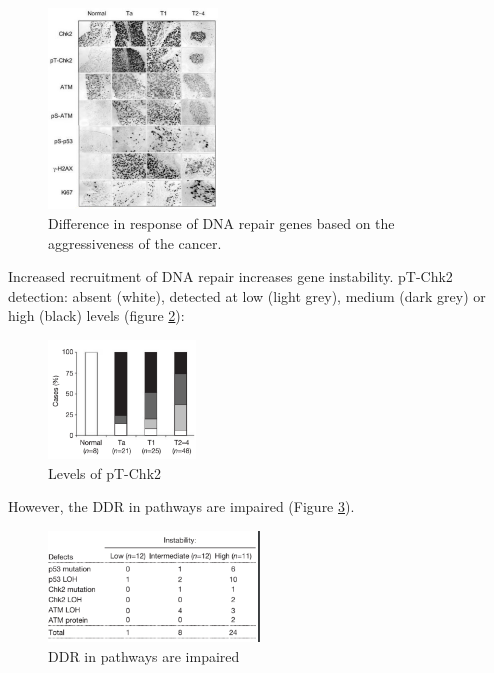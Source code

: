 \begin{figure}
\centering
\includegraphics[width=0.4\textwidth]{../_resources/b6767c28ca4d9960f33b0d725382b694.png}
\caption{Difference in response of DNA repair genes based on the aggressiveness of the cancer.}
\label{fig:repair}
\end{figure}

Increased recruitment of DNA repair increases gene instability. pT-Chk2 detection: absent (white), detected at low (light grey), medium (dark grey) or high (black) levels (figure \ref{fig:pT-Chk2}):

\begin{figure}
\centering
\includegraphics[width=0.35\textwidth]{../_resources/168deb888ea330cd5cfa4cd813e7260d.png}
\caption{Levels of pT-Chk2}
\label{fig:pT-Chk2}
\end{figure}

However, the DDR in pathways are impaired (Figure \ref{fig:DDR}).

\begin{figure}
\centering
\includegraphics[width=0.5\textwidth]{../_resources/eca41a16e9bce1f13534cbefd1902bbe.png}
\caption{DDR in pathways are impaired}
\label{fig:DDR}
\end{figure}


